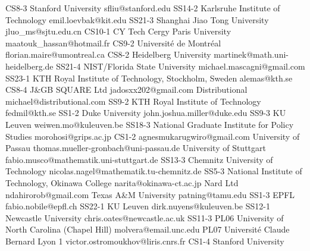 \begin{multicols}{2}
{CS8-3}
{}
{ Stanford University }
{ sfliu@stanford.edu }
{SS14-2}
{}
{ Karlsruhe Institute of Technology }
{ emil.loevbak@kit.edu }
{SS21-3}
{}
{ Shanghai Jiao Tong University }
{ jluo_ms@sjtu.edu.cn }
{CS10-1}
{}
{ CY Tech Cergy Paris University }
{ maatouk_hassan@hotmail.fr }
{CS9-2}
{}
{ Université de Montréal }
{ florian.maire@umontreal.ca }
{CS8-2}
{}
{ Heidelberg University }
{ martinek@math.uni-heidelberg.de }
{SS21-4}
{}
{ NIST/Florida State University }
{ michael.mascagni@gmail.com }
{SS23-1}
{}
{ KTH Royal Institute of Technology, Stockholm, Sweden }
{ alemas@kth.se }
{CS8-4}
{}
{ J\&GB SQUARE Ltd }
{ jadosxx202@gmail.com }
{}
{}
{ Distributional }
{ michael@distributional.com }
{SS9-2}
{}
{ KTH Royal Institute of Technology }
{ fedmil@kth.se }
{SS1-2}
{}
{ Duke University }
{ john.joshua.miller@duke.edu }
{SS9-3}
{}
{ KU Leuven }
{ weiwen.mo@kuleuven.be }
{SS18-3}
{}
{ National Graduate Institute for Policy Studies }
{ morohosi@grips.ac.jp }
{CS1-2}
{}
{}
{ agnesmukarugwiro@gmail.com }
{}
{}
{ University of Passau }
{ thomas.mueller-gronbach@uni-passau.de }
{}
{}
{ University of Stuttgart }
{ fabio.musco@mathematik.uni-stuttgart.de }
{SS13-3}
{}
{ Chemnitz University of Technology }
{ nicolas.nagel@mathematik.tu-chemnitz.de }
{SS5-3}
{}
{ National Institute of Technology, Okinawa College }
{ narita@okinawa-ct.ac.jp }
{}
{}
{ Nard Ltd }
{ ndahirorob@gmail.com }
{}
{}
{ Texas A\&M University }
{ patning@tamu.edu }
{SS1-3}
{}
{ EPFL }
{ fabio.nobile@epfl.ch }
{SS22-1}
{}
{ KU Leuven }
{ dirk.nuyens@kuleuven.be }
{SS12-1}
{}
{ Newcastle University }
{ chris.oates@newcastle.ac.uk }
{SS11-3}
{PL06}
{ University of North Carolina (Chapel Hill) }
{ molvera@email.unc.edu }
{PL07}
{}
{ Université Claude Bernard Lyon 1 }
{ victor.ostromoukhov@liris.cnrs.fr }
{CS1-4}
{}
{ Stanford University }

\end{multicols}
